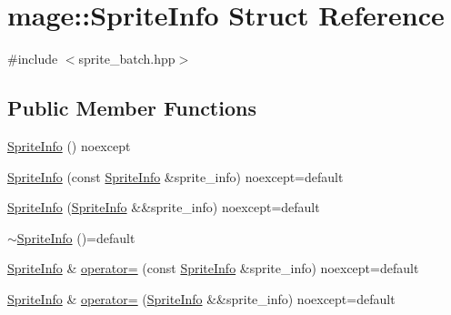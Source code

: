 \hypertarget{structmage_1_1_sprite_info}{}\section{mage\+:\+:Sprite\+Info Struct Reference}
\label{structmage_1_1_sprite_info}


{\ttfamily \#include $<$sprite\+\_\+batch.\+hpp$>$}

\subsection*{Public Member Functions}
\begin{DoxyCompactItemize}
\item 
\hyperlink{structmage_1_1_sprite_info_ade666769e0e2137e68de6fd67502b234}{Sprite\+Info} () noexcept
\item 
\hyperlink{structmage_1_1_sprite_info_a982583a2e82d55a817d9f05f423ff4cf}{Sprite\+Info} (const \hyperlink{structmage_1_1_sprite_info}{Sprite\+Info} \&sprite\+\_\+info) noexcept=default
\item 
\hyperlink{structmage_1_1_sprite_info_a8d492a5c11814926d9352ef5b682fef1}{Sprite\+Info} (\hyperlink{structmage_1_1_sprite_info}{Sprite\+Info} \&\&sprite\+\_\+info) noexcept=default
\item 
\hyperlink{structmage_1_1_sprite_info_a17d9161b88c7f920419ae9aaf8c11299}{$\sim$\+Sprite\+Info} ()=default
\item 
\hyperlink{structmage_1_1_sprite_info}{Sprite\+Info} \& \hyperlink{structmage_1_1_sprite_info_a97d38ed21effc2aca62c99acd7a54d19}{operator=} (const \hyperlink{structmage_1_1_sprite_info}{Sprite\+Info} \&sprite\+\_\+info) noexcept=default
\item 
\hyperlink{structmage_1_1_sprite_info}{Sprite\+Info} \& \hyperlink{structmage_1_1_sprite_info_a53a281b4e379f7cedd63027915929cf9}{operator=} (\hyperlink{structmage_1_1_sprite_info}{Sprite\+Info} \&\&sprite\+\_\+info) noexcept=default
\end{DoxyCompactItemize}
